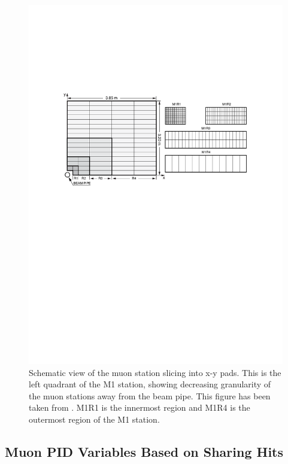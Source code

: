 \begin{figure}[!h]
        \centering
        \includegraphics[width = 1.0\textwidth]{figs/trimuon/fig2.pdf}
        \caption{Schematic view of the muon station slicing into x-y pads. This is the left quadrant of the M1 station, showing decreasing granularity of the muon stations away from the beam pipe. This figure has been taken from \cite{LHCb-DP-2012-002}. M1R1 is the innermost region and M1R4 is the outermost region of the M1 station. }
        \label{fig:pads}
\end{figure}

\subsection{Muon PID Variables Based on Sharing Hits }
\label{bugs}


